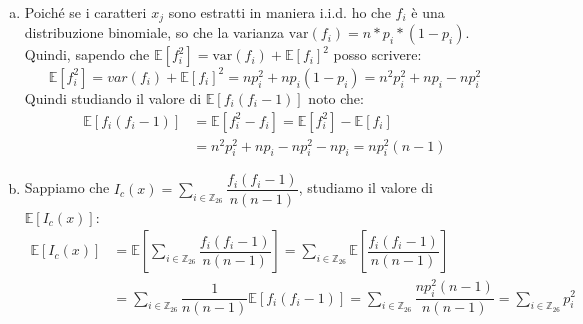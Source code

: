 \documentclass{article}
\begin{document}
\begin{enumerate}[a.]
    \item Poiché se i caratteri $x_j$ sono estratti in maniera i.i.d. ho che $f_i$ è una distribuzione            binomiale, so che la varianza $\text{var}(f_i) = n*p_i*(1-p_i)$. Quindi, sapendo che $\mathbb{E}[f^2_i] =     \text{var}(f_i) + \mathbb{E}[f_i]^2$ posso scrivere:
        \begin{equation}
            \mathbb{E}[f^2_i] = var(f_i) + \mathbb{E}[f_i]^2 = np^2_i + np_i(1-p_i) = n^2p^2_i+np_i-np^2_i
        \end{equation}
        Quindi studiando il valore di $\mathbb{E}[f_i(f_i-1)]$ noto che:
        \begin{equation}
        \begin{split}
            \mathbb{E}[f_i(f_i-1)] & = \mathbb{E}[f^2_i - f_i] =\mathbb{E}[f^2_i] - \mathbb{E}[f_i]\\ & = n^2p^2_i+np_i-np^2_i - np_i = np^2_i(n-1)
        \end{split}
        \end{equation}
        
    \item Sappiamo che $I_c(x) = \sum_{i \in \mathbb{Z}_{26}} \dfrac{f_i(f_i - 1)}{n(n-1)}$, studiamo il valore di       $\mathbb{E}[I_c(x)]$:
        \begin{equation}
        \begin{split}
            \mathbb{E}[I_c(x)] & = \mathbb{E}[\sum_{i \in \mathbb{Z}_{26}} \dfrac{f_i(f_i - 1)}{n(n-1)}] = \sum_{i \in \mathbb{Z}_{26}}\mathbb{E}[\dfrac{f_i(f_i - 1)}{n(n-1)}] \\ & = \sum_{i \in \mathbb{Z}_{26}}\dfrac{1}{n(n-1)}\mathbb{E}[f_i(f_i - 1)] = \sum_{i \in \mathbb{Z}_{26}}\dfrac{np^2_i(n-1)}{n(n-1)} = \sum_{i \in \mathbb{Z}_{26}}{p^2_i}
        \end{split}
            
        \end{equation}
    

\end{enumerate}
\end{document}
